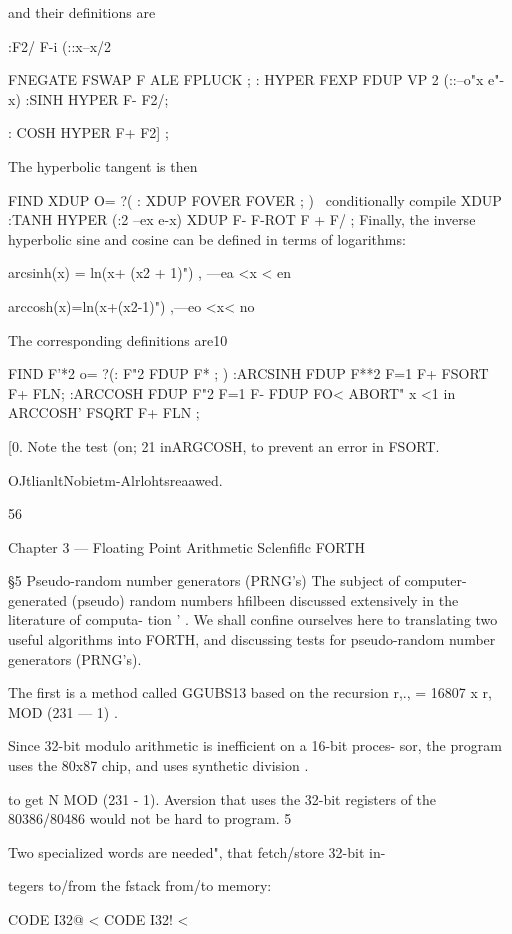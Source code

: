 and their definitions are

:F2/ F-i (::x--x/2

FNEGATE FSWAP F ALE FPLUCK ;
: HYPER FEXP FDUP VP 2 (::--o"x e"-x)
:SINH HYPER F- F2/;

: COSH HYPER F+ F2] ;

The hyperbolic tangent is then

FIND XDUP O= ?( : XDUP FOVER FOVER ; )
\ conditionally compile XDUP
:TANH HYPER (:2 --ex e-x)
XDUP F- F-ROT F + F/ ;
Finally, the inverse hyperbolic sine and cosine can be defined in
terms of logarithms:

arcsinh(x) = ln(x+ (x2 + 1)") , —ea <x < en

arccosh(x)=ln(x+(x2-1)") ,—eo <x< no

The corresponding definitions are10

FIND F'*2 o= ?(: F"2 FDUP F* ; )
:ARCSINH FDUP F**2 F=1 F+
FSORT F+ FLN;
:ARCCOSH FDUP F"2 F=1 F-
FDUP FO<
ABORT" x <1 in ARCCOSH'
FSQRT F+ FLN ;

 

[0. Note the test (on; 21 inARGCOSH, to prevent an error in FSORT.

OJtlianltNobietm-Alrlohtsreaawed.

56

Chapter 3 — Floating Point Arithmetic Sclenfiﬂc FORTH

§5 Pseudo-random number generators (PRNG's)
The subject of computer-generated (pseudo) random numbers
hfilbeen discussed extensively in the literature of computa-
tion ' . We shall confine ourselves here to translating two useful
algorithms into FORTH, and discussing tests for pseudo-random
number generators (PRNG’s).

The first is a method called GGUBS13 based on the recursion
r,., = 16807 x r, MOD (231 — 1) .

Since 32-bit modulo arithmetic is inefficient on a 16-bit proces-
sor, the program uses the 80x87 chip, and uses synthetic division .

to get N MOD (231 - 1). Aversion that uses the 32-bit registers
of the 80386/80486 would not be hard to program. 5

 

Two specialized words are needed", that fetch/store 32-bit in-

tegers to/from the fstack from/to memory:

CODE I32@ <%
CODE I32! < %

